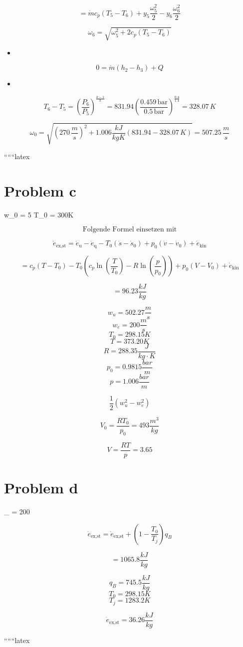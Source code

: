 \[
= \dot{m} c_p (T_5 - T_6) + y_5 \frac{\omega_5^2}{2} - y_6 \frac{\omega_6^2}{2}
\]

\[
\omega_6 = \sqrt{\omega_5^2 + 2 c_p (T_5 - T_6)}
\]

\begin{itemize}
    \item {}
\end{itemize}

\[
0 = \dot{m} (h_2 - h_3) + Q
\]

\begin{itemize}
    \item {}
\end{itemize}

\[
T_6 - T_5 = \left( \frac{P_6}{P_5} \right)^{\frac{k-1}{k}} = 831.94 \left( \frac{0.459 \, \text{bar}}{0.5 \, \text{bar}} \right)^{\frac{0.4}{1.4}} = 328.07 \, K
\]

\[
\omega_0 = \sqrt{(270 \, \frac{m}{s})^2 + 1.006 \frac{kJ}{kgK} (831.94 - 328.07 \, K)} = 507.25 \, \frac{m}{s}
\]

``````latex


\section*{Problem c}

 \quad w_0 = 5  \quad T_0 = 300K

\[
\text{Folgende Formel einsetzen mit}
\]

\[
\dot{e}_{\text{ex,st}} = \dot{e}_{\text{u}} - \dot{e}_{\text{q}} - T_0 (\dot{s} - \dot{s}_0) + p_0 (\dot{v} - \dot{v}_0) + \dot{e}_{\text{kin}}
\]

\[
= c_p (T - T_0) - T_0 \left( c_p \ln \left( \frac{T}{T_0} \right) - R \ln \left( \frac{p}{p_0} \right) \right) + p_0 (V - V_0) + \dot{e}_{\text{kin}}
\]

\[
= \boxed{96.23 \frac{kJ}{kg}}
\]

\[
w_u = 502.27 \frac{m}{s}
\]
\[
w_e = 200 \frac{m}{s}
\]
\[
T_0 = 298.15 K
\]
\[
T = 373.20 K
\]
\[
R = 288.35 \frac{J}{kg \cdot K}
\]
\[
p_0 = 0.9815 \frac{bar}{m}
\]
\[
p = 1.006 \frac{bar}{m}
\]

\[
\frac{1}{2} (w_u^2 - w_e^2)
\]

\[
V_0 = \frac{RT_0}{p_0} = 493 \frac{m^3}{kg}
\]

\[
V = \frac{RT}{p} = 3.65
\]

\section*{Problem d}

 \quad {}_{} = 200 

\[
\dot{e}_{\text{ex,st}} = \dot{e}_{\text{ex,st}} + \left( 1 - \frac{T_0}{T_j} \right) q_B
\]

\[
= 1065.8 \frac{kJ}{kg}
\]

\[
q_B = 745.5 \frac{kJ}{kg}
\]
\[
T_0 = 298.15 K
\]
\[
T_j = 1283.2 K
\]

\[
\dot{e}_{\text{ex,st}} = 36.26 \frac{kJ}{kg}
\]

``````latex


